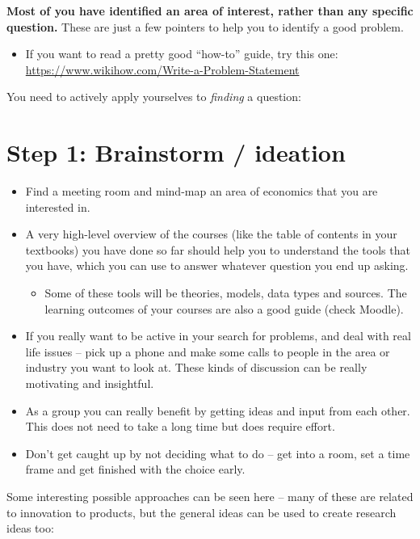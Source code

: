 \documentclass[
]{book}
\providecommand{\tightlist}{%
  \setlength{\itemsep}{0pt}\setlength{\parskip}{0pt}}
\begin{document}
\textbf{Most of you have identified an area of interest, rather than any
specific question.} These are just a few pointers to help you to
identify a good problem.

\begin{itemize}
\tightlist
\item
  If you want to read a pretty good ``how-to'' guide, try this one:
  \url{https://www.wikihow.com/Write-a-Problem-Statement}
\end{itemize}

You need to actively apply yourselves to \emph{finding} a question:

\hypertarget{step-1-brainstorm-ideation}{%
\section{Step 1: Brainstorm / ideation}\label{step-1-brainstorm-ideation}}

\begin{itemize}
\item
  Find a meeting room and mind-map an area of economics that you are
  interested in.
\item
  A very high-level overview of the courses (like the table of
  contents in your textbooks) you have done so far should help you to
  understand the tools that you have, which you can use to answer
  whatever question you end up asking.

  \begin{itemize}
  \tightlist
  \item
    Some of these tools will be theories, models, data types and
    sources. The learning outcomes of your courses are also a good
    guide (check Moodle).
  \end{itemize}
\item
  If you really want to be active in your search for problems, and
  deal with real life issues -- pick up a phone and make some calls to
  people in the area or industry you want to look at. These kinds of
  discussion can be really motivating and insightful.
\item
  As a group you can really benefit by getting ideas and input from
  each other. This does not need to take a long time but does require
  effort.
\item
  Don't get caught up by not deciding what to do -- get into a room,
  set a time frame and get finished with the choice early.
\end{itemize}

Some interesting possible approaches can be seen here -- many of these
are related to innovation to products, but the general ideas can be used
to create research ideas too:
\end{document}

